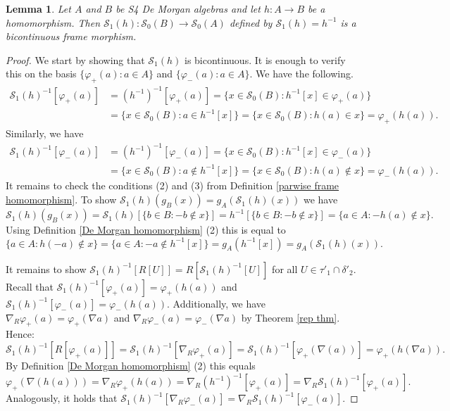 \documentclass{amsart}
\theoremstyle{plain}
\newtheorem{lemma}[theorem]{Lemma}
\theoremstyle{definition}
\begin{document}
\begin{lemma}\label{homo to cont}
    Let $A$ and $B$ be S4 De Morgan algebras and let $h:A \to B$ be a homomorphism. Then $\mathcal{S}_1(h):\mathcal{S}_0(B) \to \mathcal{S}_0(A)$ defined by $\mathcal{S}_1(h)=h^{-1}$ is a bicontinuous frame morphism.
\end{lemma}

\begin{proof}
We start by showing that $\mathcal{S}_1(h)$ is bicontinuous. It is enough to verify this on the basis $\{\varphi_+(a):a\in A\}$ and $\{\varphi_-(a):a\in A\}$.
We have the following.
\begin{align*}
    \mathcal{S}_1(h)^{-1}[\varphi_+(a)]&=(h^{-1})^{-1}[\varphi_+(a)]=\{x \in \mathcal{S}_0(B) : h^{-1}[x] \in \varphi_+(a)\}\\&=\{x \in \mathcal{S}_0(B) : a \in h^{-1}[x]\}=\{x \in \mathcal{S}_0(B) : h(a) \in x\}=\varphi_+(h(a)).
\end{align*}
Similarly, we have
\begin{align*}
    \mathcal{S}_1(h)^{-1}[\varphi_-(a)]&=(h^{-1})^{-1}[\varphi_-(a)]=\{x \in \mathcal{S}_0(B) : h^{-1}[x] \in \varphi_-(a)\}\\&=\{x \in \mathcal{S}_0(B) : a \notin h^{-1}[x]\}=\{x \in \mathcal{S}_0(B) : h(a) \notin x\}=\varphi_-(h(a)).
\end{align*}
It remains to check the conditions (2) and (3) from Definition  \ref{parwise frame homomorphism}.
To show $\mathcal{S}_1(h)(g_B(x))=g_A(\mathcal{S}_1(h)(x))$ we have
$$\mathcal{S}_1(h)(g_B(x))=\mathcal{S}_1(h)[\{b \in B : -b \notin x\}]=h^{-1}[\{b \in B : -b \notin x\}]=\{a \in A : -h(a) \notin x\}.$$ Using Definition \ref{De Morgan homomorphism} (2) this is equal to 
$$\{a \in A : h(-a) \notin x\}=\{a \in A : -a \notin h^{-1}[x]\}=g_A(h^{-1}[x])=g_A(\mathcal{S}_{1}(h)(x)).$$

It remains to show $\mathcal{S}_1(h)^{-1}[R[U]]=R[\mathcal{S}_1(h)^{-1}[U]]$ for all $U \in \tau'_1 \cap \delta'_2$. Recall that $\mathcal{S}_1(h)^{-1}[\varphi_+(a)]=\varphi_+(h(a))$ and $\mathcal{S}_1(h)^{-1}[\varphi_-(a)]=\varphi_-(h(a))$. Additionally, we have $\nabla_R\varphi_+(a)=\varphi_+(\nabla a)$ and $\nabla_R\varphi_-(a)=\varphi_-(\nabla a)$ by Theorem \ref{rep thm}. Hence:  
 $$\mathcal{S}_1(h)^{-1}[R[\varphi_+(a)]]=\mathcal{S}_1(h)^{-1}[\nabla_R \varphi_+(a)]=\mathcal{S}_1(h)^{-1}[\varphi_+(\nabla (a))]=\varphi_+(h (\nabla a)).$$
By Definition \ref{De Morgan homomorphism} (2) this equals
$$\varphi_+ (\nabla (h(a)))=\nabla_R \varphi_+(h(a))=\nabla_R(h^{-1})^{-1}[\varphi_+(a)]=\nabla_R \mathcal{S}_1(h)^{-1}[\varphi_+(a)].$$
Analogously, it holds that $\mathcal{S}_1(h)^{-1}[\nabla_R \varphi_-(a)]=\nabla_R \mathcal{S}_1(h)^{-1}[\varphi_-(a)]$.  
\end{proof}
\end{document}
